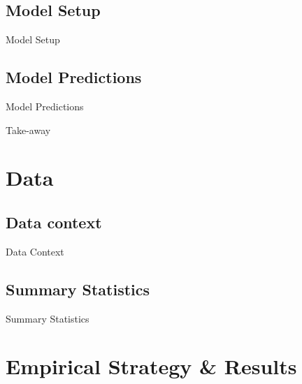 \documentclass[10pt]{beamer}
\begin{document}
\subsection{Model Setup}
\begin{frame}{Model Setup}
\small 

\end{frame}


\subsection{Model Predictions}
\begin{frame}{Model Predictions}
\end{frame}



\begin{frame}{Take-away}

\end{frame}





\section{Data}

\subsection{Data context}

\begin{frame}{Data Context}
\linespread{1.5}
\end{frame}


\subsection{Summary Statistics}
\begin{frame}{Summary Statistics}

\end{frame}



\section{Empirical Strategy \& Results}
\end{document}
